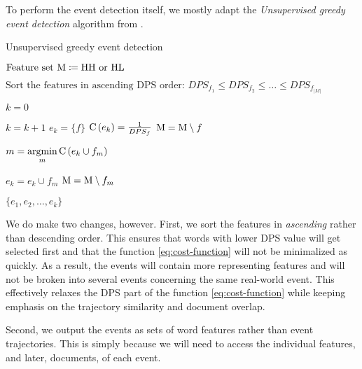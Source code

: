 To perform the event detection itself, we mostly adapt the \textit{Unsupervised greedy event detection} algorithm from \cite{event-detection}.

\begin{algorithm}[H]
\begin{algorithmic}[1]
\caption{Unsupervised greedy event detection}
\Input $\text{Feature set} ~ \text{M} \coloneqq \text{HH or HL}$

\State $\text{Sort the features in ascending DPS order: } DPS_{f_{1}} \leq DPS_{f_{2}} \leq \dots \leq DPS_{f_{\left\vert M \right\vert}}$

\State $k = 0$

	\State $k = k + 1$	
	\State $e_{k} = \{ f \}$
	\State $\text{C} \left(e_{k} \right) = \frac{1}{DPS_{f}}$
	\State $\text{M} = \text{M} \setminus f$
	
		\State $m = \operatorname*{argmin}\limits_{m}{\text{C} \left( e_{k} \cup f_{m} \right)}$

			\State $e_{k} = e_{k} \cup f_{m}$
			\State $\text{M} = \text{M} \setminus f_{m}$
		\Else
			\Break
		\EndIf
	\EndWhile
\EndFor

\Output $\{ e_{1}, e_{2}, \dots, e_{k} \}$
\end{algorithmic}
\end{algorithm}

We do make two changes, however. First, we sort the features in \textit{ascending} rather than descending order. This ensures that words with lower DPS value will get selected first and that the function \ref{eq:cost-function} will not be minimalized as quickly. As a result, the events will contain more representing features and will not be broken into several events concerning the same real-world event. This effectively relaxes the DPS part of the function \ref{eq:cost-function} while keeping emphasis on the trajectory similarity and document overlap.

Second, we output the events as sets of word features rather than event trajectories. This is simply because we will need to access the individual features, and later, documents, of each event.